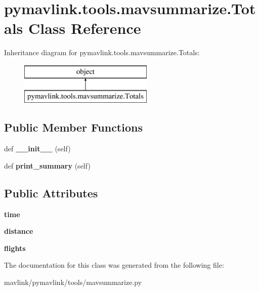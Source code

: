 \hypertarget{classpymavlink_1_1tools_1_1mavsummarize_1_1Totals}{}\section{pymavlink.\+tools.\+mavsummarize.\+Totals Class Reference}
\label{classpymavlink_1_1tools_1_1mavsummarize_1_1Totals}
Inheritance diagram for pymavlink.\+tools.\+mavsummarize.\+Totals\+:\begin{figure}[H]
\begin{center}
\leavevmode
\includegraphics[height=2.000000cm]{classpymavlink_1_1tools_1_1mavsummarize_1_1Totals}
\end{center}
\end{figure}
\subsection*{Public Member Functions}
\begin{DoxyCompactItemize}
\item 
\mbox{\label{classpymavlink_1_1tools_1_1mavsummarize_1_1Totals_ae1e7634a5a5773d76f27b18ab18c3ed7}} 
def {\bfseries \+\_\+\+\_\+init\+\_\+\+\_\+} (self)
\item 
\mbox{\label{classpymavlink_1_1tools_1_1mavsummarize_1_1Totals_a9eeac7c9507bd37d9ec74306996952ab}} 
def {\bfseries print\+\_\+summary} (self)
\end{DoxyCompactItemize}
\subsection*{Public Attributes}
\begin{DoxyCompactItemize}
\item 
\mbox{\label{classpymavlink_1_1tools_1_1mavsummarize_1_1Totals_ae80f37b87665285091c33bdc8a7b3b87}} 
{\bfseries time}
\item 
\mbox{\label{classpymavlink_1_1tools_1_1mavsummarize_1_1Totals_a6870dae3b849727b5dbabcc8715de751}} 
{\bfseries distance}
\item 
\mbox{\label{classpymavlink_1_1tools_1_1mavsummarize_1_1Totals_a6dd092e8fd7d6e18d60d167df37d4d06}} 
{\bfseries flights}
\end{DoxyCompactItemize}


The documentation for this class was generated from the following file\+:\begin{DoxyCompactItemize}
\item 
mavlink/pymavlink/tools/mavsummarize.\+py\end{DoxyCompactItemize}
